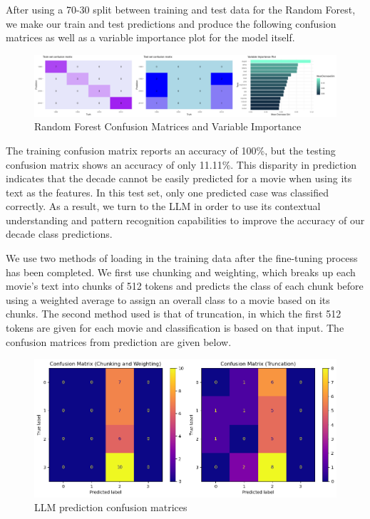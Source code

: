 \documentclass[
  authoryear,
  preprint]{elsarticle}
\begin{document}
After using a 70-30 split between training and test data for the Random
Forest, we make our train and test predictions and produce the following
confusion matrices as well as a variable importance plot for the model
itself.

\begin{figure}[H]

{\centering \includegraphics{images/rf_imp-imageonline.co-merged.png}

}

\caption{Random Forest Confusion Matrices and Variable Importance}

\end{figure}%

The training confusion matrix reports an accuracy of 100\%, but the
testing confusion matrix shows an accuracy of only 11.11\%. This
disparity in prediction indicates that the decade cannot be easily
predicted for a movie when using its text as the features. In this test
set, only one predicted case was classified correctly. As a result, we
turn to the LLM in order to use its contextual understanding and pattern
recognition capabilities to improve the accuracy of our decade class
predictions.~

We use two methods of loading in the training data after the fine-tuning
process has been completed. We first use chunking and weighting, which
breaks up each movie's text into chunks of 512 tokens and predicts the
class of each chunk before using a weighted average to assign an overall
class to a movie based on its chunks. The second method used is that of
truncation, in which the first 512 tokens are given for each movie and
classification is based on that input. The confusion matrices from
prediction are given below.

\begin{figure}[H]

{\centering \includegraphics{images/trunc_llm-imageonline.co-merged.png}

}

\caption{LLM prediction confusion matrices}

\end{figure}%
\end{document}
